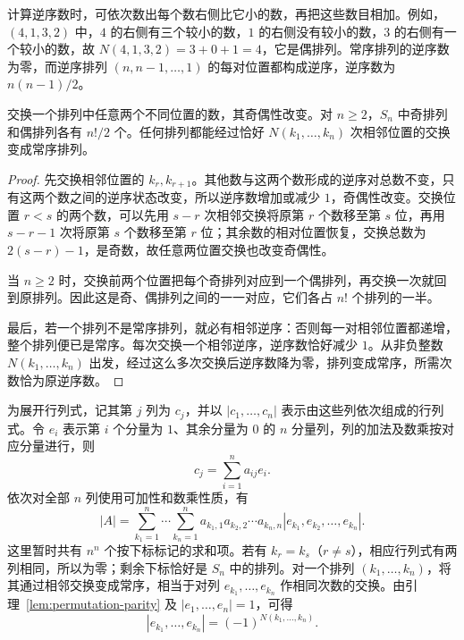 计算逆序数时，可依次数出每个数右侧比它小的数，再把这些数目相加。例如，$(4,1,3,2)$ 中，$4$ 的右侧有三个较小的数，$1$ 的右侧没有较小的数，$3$ 的右侧有一个较小的数，故 $N(4,1,3,2)=3+0+1=4$，它是偶排列。常序排列的逆序数为零，而逆序排列 $(n,n-1,\ldots,1)$ 的每对位置都构成逆序，逆序数为 $n(n-1)/2$。

\begin{lemma}[交换与排列的奇偶性]
\label{lem:permutation-parity}
交换一个排列中任意两个不同位置的数，其奇偶性改变。对 $n\geq2$，$S_n$ 中奇排列和偶排列各有 $n!/2$ 个。任何排列都能经过恰好 $N(k_1,\ldots,k_n)$ 次相邻位置的交换变成常序排列。
\end{lemma}
\begin{proof}
先交换相邻位置的 $k_r,k_{r+1}$。其他数与这两个数形成的逆序对总数不变，只有这两个数之间的逆序状态改变，所以逆序数增加或减少 $1$，奇偶性改变。交换位置 $r<s$ 的两个数，可以先用 $s-r$ 次相邻交换将原第 $r$ 个数移至第 $s$ 位，再用 $s-r-1$ 次将原第 $s$ 个数移至第 $r$ 位；其余数的相对位置恢复，交换总数为 $2(s-r)-1$，是奇数，故任意两位置交换也改变奇偶性。

当 $n\geq2$ 时，交换前两个位置把每个奇排列对应到一个偶排列，再交换一次就回到原排列。因此这是奇、偶排列之间的一一对应，它们各占 $n!$ 个排列的一半。

最后，若一个排列不是常序排列，就必有相邻逆序：否则每一对相邻位置都递增，整个排列便已是常序。每次交换一个相邻逆序，逆序数恰好减少 $1$。从非负整数 $N(k_1,\ldots,k_n)$ 出发，经过这么多次交换后逆序数降为零，排列变成常序，所需次数恰为原逆序数。
\end{proof}

为展开行列式，记其第 $j$ 列为 $c_j$，并以 $|c_1,\ldots,c_n|$ 表示由这些列依次组成的行列式。令 $e_i$ 表示第 $i$ 个分量为 $1$、其余分量为 $0$ 的 $n$ 分量列，列的加法及数乘按对应分量进行，则
\[
    c_j=\sum_{i=1}^{n}a_{ij}e_i.
\]
依次对全部 $n$ 列使用可加性和数乘性质，有
\begin{equation}
\label{eq:determinant-multilinear-expansion}
    |A|=\sum_{k_1=1}^{n}\cdots\sum_{k_n=1}^{n}
       a_{k_1,1}a_{k_2,2}\cdots a_{k_n,n}
       |e_{k_1},e_{k_2},\ldots,e_{k_n}|.
\end{equation}
这里暂时共有 $n^n$ 个按下标标记的求和项。若有 $k_r=k_s$（$r\ne s$），相应行列式有两列相同，所以为零；剩余下标恰好是 $S_n$ 中的排列。对一个排列 $(k_1,\ldots,k_n)$，将其通过相邻交换变成常序，相当于对列 $e_{k_1},\ldots,e_{k_n}$ 作相同次数的交换。由引理~\ref{lem:permutation-parity} 及 $|e_1,\ldots,e_n|=1$，可得
\[
    |e_{k_1},\ldots,e_{k_n}|=(-1)^{N(k_1,\ldots,k_n)}.
\]

